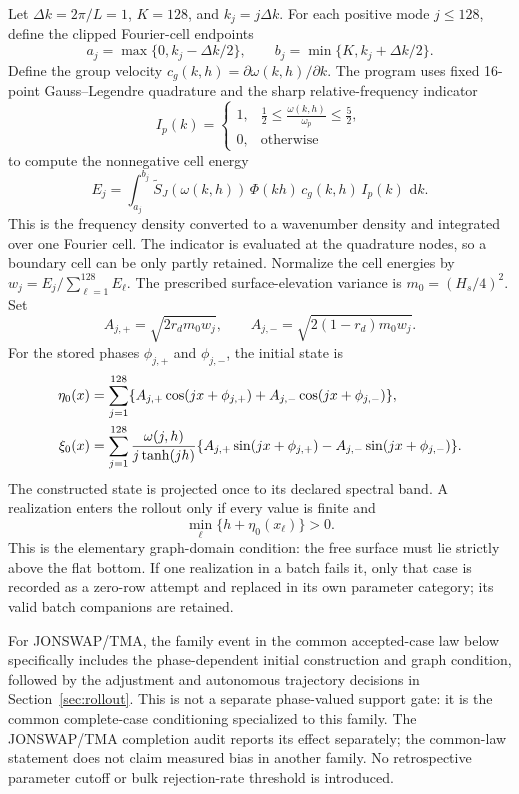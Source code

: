 \documentclass[10pt]{article}
\newcommand{\dd}{\,\mathrm d}
\begin{document}
Let $\Delta k=2\pi/L=1$, $K=128$, and $k_j=j\Delta k$.  For each positive
mode $j\leq128$, define the clipped Fourier-cell endpoints
\[
  a_j=\max\{0,k_j-\Delta k/2\},\qquad
  b_j=\min\{K,k_j+\Delta k/2\}.
\]
Define the group velocity
$c_g(k,h)=\partial\omega(k,h)/\partial k$.  The program uses fixed 16-point
Gauss--Legendre quadrature and the sharp relative-frequency indicator
\begin{equation}
  I_p(k)=
  \begin{cases}
    1,&\displaystyle \frac12\leq
       \frac{\omega(k,h)}{\omega_p}\leq\frac52,\\
    0,&\text{otherwise}
  \end{cases}
  \label{eq:relative-frequency-window}
\end{equation}
to compute the nonnegative cell energy
\[
  E_j
  =
  \int_{a_j}^{b_j}
  \widetilde S_J(\omega(k,h))\,
  \Phi(kh)\,c_g(k,h)\,I_p(k)\,\dd k.
\]
This is the frequency density converted to a wavenumber density and
integrated over one Fourier cell.  The indicator is evaluated at the
quadrature nodes, so a boundary cell can be only partly retained.  Normalize
the cell energies by
$w_j=E_j/\sum_{\ell=1}^{128}E_\ell$.  The prescribed surface-elevation
variance is $m_0=(H_s/4)^2$.  Set
\[
  A_{j,+}=\sqrt{2r_dm_0w_j},\qquad
  A_{j,-}=\sqrt{2(1-r_d)m_0w_j}.
\]
For the stored phases $\phi_{j,+}$ and $\phi_{j,-}$, the initial state is
\begin{align}
  \eta_0(x)
  &=
  \sum_{j=1}^{128}
  \{A_{j,+}\cos(jx+\phi_{j,+})
    +A_{j,-}\cos(jx+\phi_{j,-})\}, \notag\\
  \xi_0(x)
  &=
  \sum_{j=1}^{128}
  \frac{\omega(j,h)}{j\tanh(jh)}
  \{A_{j,+}\sin(jx+\phi_{j,+})
    -A_{j,-}\sin(jx+\phi_{j,-})\}.
  \label{eq:sea-state}
\end{align}
The constructed state is projected once to its declared spectral band.  A
realization enters the rollout only if every value is finite and
\[
  \min_\ell\{h+\eta_0(x_\ell)\}>0.
\]
This is the elementary graph-domain condition: the free surface must lie
strictly above the flat bottom.  If one realization in a batch fails it, only
that case is recorded as a zero-row attempt and replaced in its own parameter
category; its valid batch companions are retained.

For JONSWAP/TMA, the family event in the common accepted-case law below
specifically includes the phase-dependent initial construction and graph
condition, followed by the adjustment and autonomous trajectory decisions in
Section~\ref{sec:rollout}.  This is not a separate phase-valued support gate:
it is the common complete-case conditioning specialized to this family.  The
JONSWAP/TMA completion audit reports its effect separately; the common-law
statement does not claim measured bias in another family.  No retrospective
parameter cutoff or bulk rejection-rate threshold is introduced.
\end{document}
